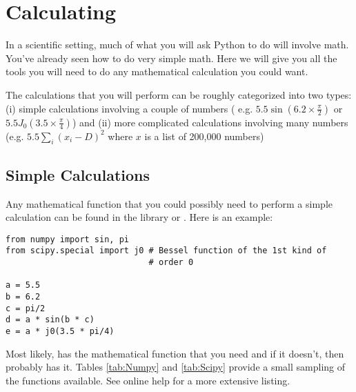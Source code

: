 \chapter{Calculating}
\label{chap:Calculating}
In a scientific setting, much of what you will ask Python to do will
involve math.  You've already seen how to do very simple math. Here we
will give you all the tools you will need to do any mathematical
calculation you could want.

The calculations that you will perform can be roughly categorized into
two types: (i) simple calculations involving a couple of numbers ( e.g.
$5.5 \sin(6.2 \times \frac{\pi}{2})$ or $5.5 J_0(3.5 \times
\frac{\pi}{4})$) and (ii) more complicated calculations involving many
numbers (e.g. $5.5 \sum_i (x_i - D)^2$ where $x$ is a list of 200,000
numbers)
\section{Simple Calculations}
Any mathematical function that you could possibly need to perform a
simple calculation can be found in the library  or
. Here is an example:
\begin{Verbatim}
from numpy import sin, pi
from scipy.special import j0 # Bessel function of the 1st kind of
                             # order 0

a = 5.5
b = 6.2
c = pi/2
d = a * sin(b * c)
e = a * j0(3.5 * pi/4)
\end{Verbatim}

Most likely,  has the mathematical function that you need
and if it doesn't, then  probably has it. Tables
\ref{tab:Numpy} and \ref{tab:Scipy} provide a small sampling of the
functions available.  See online help for a more extensive listing.

